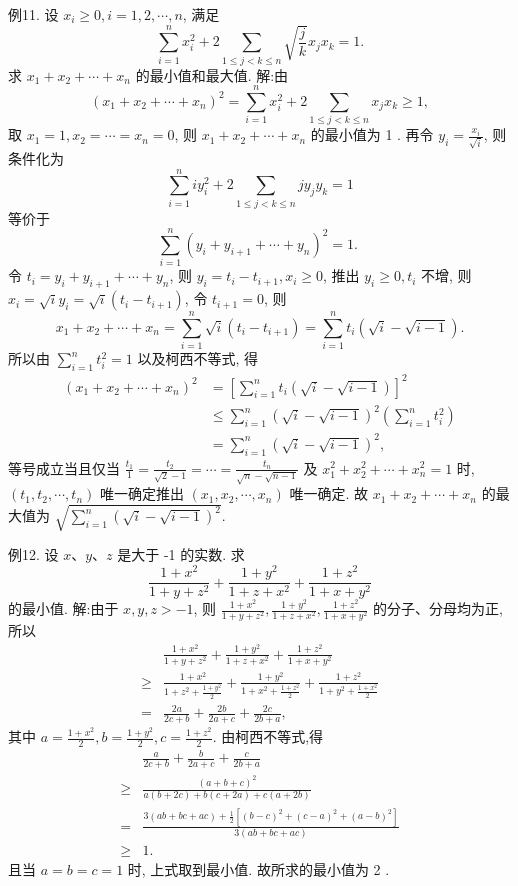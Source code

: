 例11. 设 $x_i \geqslant 0, i=1,2, \cdots, n$, 满足
$$
\sum_{i=1}^n x_i^2+2 \sum_{1 \leqslant j<k \leqslant n} \sqrt{\frac{j}{k}} x_j x_k=1 .
$$
求 $x_1+x_2+\cdots+x_n$ 的最小值和最大值.
解:由
$$
\left(x_1+x_2+\cdots+x_n\right)^2=\sum_{i=1}^n x_i^2+2 \sum_{1 \leqslant j<k \leqslant n} x_j x_k \geqslant 1,
$$
取 $x_1=1, x_2=\cdots=x_n=0$, 则 $x_1+x_2+\cdots+x_n$ 的最小值为 1 . 再令 $y_i= \frac{x_i}{\sqrt{i}}$, 则条件化为
$$
\sum_{i=1}^n i y_i^2+2 \sum_{1 \leqslant j<k \leqslant n} j y_j y_k=1
$$
等价于
$$
\sum_{i=1}^n\left(y_i+y_{i+1}+\cdots+y_n\right)^2=1 \text {. }
$$
令 $t_i=y_i+y_{i+1}+\cdots+y_n$, 则 $y_i=t_i-t_{i+1}, x_i \geqslant 0$, 推出 $y_i \geqslant 0, t_i$ 不增, 则 $x_i=\sqrt{i} y_i=\sqrt{i}\left(t_i-t_{i+1}\right)$, 令 $t_{i+1}=0$, 则
$$
x_1+x_2+\cdots+x_n=\sum_{i=1}^n \sqrt{i}\left(t_i-t_{i+1}\right)=\sum_{i=1}^n t_i(\sqrt{i}-\sqrt{i-1}) .
$$
所以由 $\sum_{i=1}^n t_i^2=1$ 以及柯西不等式, 得
$$
\begin{aligned}
\left(x_1+x_2+\cdots+x_n\right)^2 & =\left[\sum_{i=1}^n t_i(\sqrt{i}-\sqrt{i-1})\right]^2 \\
& \leqslant \sum_{i=1}^n(\sqrt{i}-\sqrt{i-1})^2\left(\sum_{i=1}^n t_i^2\right) \\
& =\sum_{i=1}^n(\sqrt{i}-\sqrt{i-1})^2,
\end{aligned}
$$
等号成立当且仅当 $\frac{t_1}{1}=\frac{t_2}{\sqrt{2}-1}=\cdots=\frac{t_n}{\sqrt{n}-\sqrt{n-1}}$ 及 $x_1^2+x_2^2+\cdots+ x_n^2=1$ 时, $\left(t_1, t_2, \cdots, t_n\right)$ 唯一确定推出 $\left(x_1, x_2, \cdots, x_n\right)$ 唯一确定.
故 $x_1+ x_2+\cdots+x_n$ 的最大值为 $\sqrt{\sum_{i=1}^n(\sqrt{i}-\sqrt{i-1})^2}$.



例12. 设 $x 、 y 、 z$ 是大于 -1 的实数.
求
$$
\frac{1+x^2}{1+y+z^2}+\frac{1+y^2}{1+z+x^2}+\frac{1+z^2}{1+x+y^2}
$$
的最小值.
解:由于 $x, y, z>-1$, 则 $\frac{1+x^2}{1+y+z^2}, \frac{1+y^2}{1+z+x^2}, \frac{1+z^2}{1+x+y^2}$ 的分子、分母均为正, 所以
$$
\begin{aligned}
& \frac{1+x^2}{1+y+z^2}+\frac{1+y^2}{1+z+x^2}+\frac{1+z^2}{1+x+y^2} \\
\geqslant & \frac{1+x^2}{1+z^2+\frac{1+y^2}{2}}+\frac{1+y^2}{1+x^2+\frac{1+z^2}{2}}+\frac{1+z^2}{1+y^2+\frac{1+x^2}{2}} \\
= & \frac{2 a}{2 c+b}+\frac{2 b}{2 a+c}+\frac{2 c}{2 b+a},
\end{aligned}
$$
其中 $a=\frac{1+x^2}{2}, b=\frac{1+y^2}{2}, c=\frac{1+z^2}{2}$.
由柯西不等式,得
$$
\begin{aligned}
& \frac{a}{2 c+b}+\frac{b}{2 a+c}+\frac{c}{2 b+a} \\
\geqslant & \frac{(a+b+c)^2}{a(b+2 c)+b(c+2 a)+c(a+2 b)} \\
= & \frac{3(a b+b c+a c)+\frac{1}{2}\left[(b-c)^2+(c-a)^2+(a-b)^2\right]}{3(a b+b c+a c)} \\
\geqslant & 1 .
\end{aligned}
$$
且当 $a=b=c=1$ 时, 上式取到最小值.
故所求的最小值为 2 .



